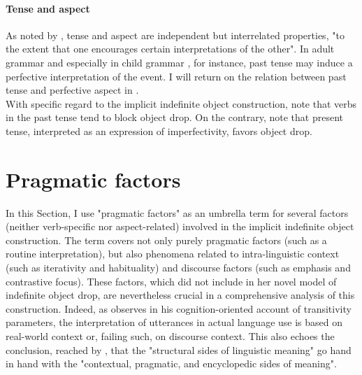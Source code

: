 \paragraph{Tense and aspect}
As noted by \textcite[68]{Medina2007}, tense and aspect are independent but interrelated properties, "to the extent that one encourages certain interpretations of the other". In adult grammar \parencite{comrie1976aspect} and especially in child grammar \parencite{wagner2001aspectual}, for instance, past tense may induce a perfective interpretation of the event. I will return on the relation between past tense and perfective aspect in .\\
With specific regard to the implicit indefinite object construction, \textcite{Dixon1992, Goldberg2005a, Glass2020} note that verbs in the past tense tend to block object drop. On the contrary, \textcite[9]{Garcia-VelascoMunoz2002} note that present tense, interpreted as an expression of imperfectivity, favors object drop.


\section{Pragmatic factors} 

In this Section, I use "pragmatic factors" as an umbrella term for several factors (neither verb-specific nor aspect-related) involved in the implicit indefinite object construction. The term covers not only purely pragmatic factors (such as a routine interpretation), but also phenomena related to intra-linguistic context (such as iterativity and habituality) and discourse factors (such as emphasis and contrastive focus). These factors, which \textcite{Medina2007} did not include in her novel model of indefinite object drop, are nevertheless crucial in a comprehensive analysis of this construction. Indeed, as \textcite[54]{delancey1987transitivity} observes in his cognition-oriented account of transitivity parameters, the interpretation of utterances in actual language use is based on real-world context or, failing such, on discourse context. This also echoes the conclusion, reached by \textcite[176]{Prytz2016}, that the "structural sides of linguistic meaning" go hand in hand with the "contextual, pragmatic, and encyclopedic sides of meaning".

